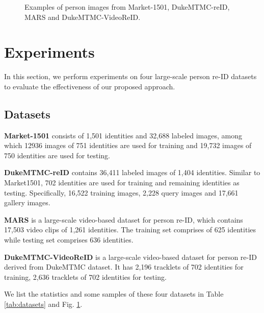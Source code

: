 \documentclass[journal]{IEEEtran}
\begin{document}
\begin{figure}[htb]
\centering
{}
\quad 
{}



\quad 
{}
\caption{Examples of person images from Market-1501, DukeMTMC-reID, MARS and DukeMTMC-VideoReID.}
\label{fig:datasets}
\end{figure}
 \section{Experiments}
\label{sec:experiments}
In this section, we perform experiments on four large-scale person re-ID datasets to evaluate the effectiveness of our proposed approach.



\subsection{Datasets}
\label{subsec:datasets}
\textbf{Market-1501} \cite{zheng2015scalable} consists of 1,501 identities and 32,688 labeled images, among which 12936 images of 751 identities are used for training and 19,732 images of 750 identities are used for testing.

\textbf{DukeMTMC-reID} \cite{zheng2017unlabeled} contains 36,411 labeled images of 1,404 identities. Similar to Market1501, 702 identities are used for training and remaining identities as testing. Specifically, 16,522 training images, 2,228 query images and 17,661 gallery images.

\textbf{MARS} \cite{zheng2016mars} is a large-scale video-based dataset for person re-ID, which contains 17,503 video clips of 1,261 identities. The training set comprises of 625 identities while testing set comprises 636 identities.

\textbf{DukeMTMC-VideoReID} \cite{wu2019progressive} is a large-scale video-based dataset for person re-ID derived from DukeMTMC dataset. It has 2,196 tracklets of 702 identities for training, 2,636 tracklets of 702 identities for testing.

We list the statistics and some samples of these four datasets in Table \ref{tab:datasets} and Fig. \ref{fig:datasets}.
\end{document}
